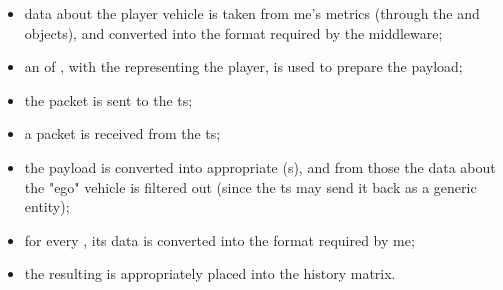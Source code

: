 \begin{itemize}
	\item data about the player vehicle is taken from \gls{me}'s metrics (through the  and  objects), and converted into the format required by the \gls{middleware};
	\item an  of , with the  representing the player, is used to prepare the payload;
	\item the packet is sent to the \gls{ts};
	\item a packet is received from the \gls{ts};
	\item the payload is converted into appropriate (s), and from those the data about the "ego" vehicle is filtered out (since the \gls{ts} may send it back as a generic entity);
	\item for every , its data is converted into the format required by \gls{me};
	\item the resulting  is appropriately placed into the history matrix.
\end{itemize}

